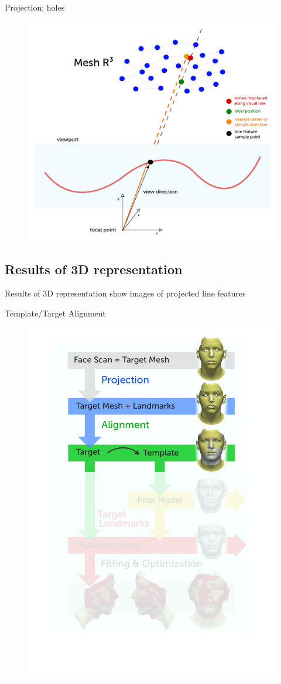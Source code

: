 \documentclass[xcolor=x11names,compress]{beamer}
\begin{document}
    \begin{frame}{Projection: holes}
        \begin{figure}
            \centering
            \includegraphics[width=.8\textwidth]{../resources/figures/projection_holes.pdf}
        \end{figure}
    \end{frame}


    \subsection{Results of 3D representation}
    \begin{frame}{Results of 3D representation}
        show images of projected line features
    \end{frame}

    \begin{frame}{Template/Target Alignment}
        \begin{figure}   
            \centering
            \includegraphics[width=.6\textwidth]{../resources/figures/pipeline_alignment.pdf}
        \end{figure}
    \end{frame}
\end{document}

